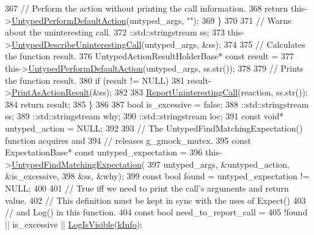 \begin{DoxyCode}
367       \textcolor{comment}{// Perform the action without printing the call information.}
368       \textcolor{keywordflow}{return} this->\hyperlink{classtesting_1_1internal_1_1UntypedFunctionMockerBase_a2cb149456cd559d5b0615f2310b235e3}{UntypedPerformDefaultAction}(untyped\_args, \textcolor{stringliteral}{""});
369     \}
370 
371     \textcolor{comment}{// Warns about the uninteresting call.}
372     ::std::stringstream ss;
373     this->\hyperlink{classtesting_1_1internal_1_1UntypedFunctionMockerBase_aeb80e61406142e87f94fab10873e20ce}{UntypedDescribeUninterestingCall}(untyped\_args, &ss);
374 
375     \textcolor{comment}{// Calculates the function result.}
376     UntypedActionResultHolderBase* \textcolor{keyword}{const} result =
377         this->\hyperlink{classtesting_1_1internal_1_1UntypedFunctionMockerBase_a2cb149456cd559d5b0615f2310b235e3}{UntypedPerformDefaultAction}(untyped\_args, ss.str());
378 
379     \textcolor{comment}{// Prints the function result.}
380     \textcolor{keywordflow}{if} (result != NULL)
381       result->\hyperlink{classtesting_1_1internal_1_1UntypedActionResultHolderBase_a4b4a558fcb1d3b02c0fec34f186d3b90}{PrintAsActionResult}(&ss);
382 
383     \hyperlink{namespacetesting_1_1internal_a8d99a1e87d0cea563b2bfad8a4e65276}{ReportUninterestingCall}(reaction, ss.str());
384     \textcolor{keywordflow}{return} result;
385   \}
386 
387   \textcolor{keywordtype}{bool} is\_excessive = \textcolor{keyword}{false};
388   ::std::stringstream ss;
389   ::std::stringstream why;
390   ::std::stringstream loc;
391   \textcolor{keyword}{const} \textcolor{keywordtype}{void}* untyped\_action = NULL;
392 
393   \textcolor{comment}{// The UntypedFindMatchingExpectation() function acquires and}
394   \textcolor{comment}{// releases g\_gmock\_mutex.}
395   \textcolor{keyword}{const} ExpectationBase* \textcolor{keyword}{const} untyped\_expectation =
396       this->\hyperlink{classtesting_1_1internal_1_1UntypedFunctionMockerBase_a6461abd05786eee4e125a2695382852d}{UntypedFindMatchingExpectation}(
397           untyped\_args, &untyped\_action, &is\_excessive,
398           &ss, &why);
399   \textcolor{keyword}{const} \textcolor{keywordtype}{bool} found = untyped\_expectation != NULL;
400 
401   \textcolor{comment}{// True iff we need to print the call's arguments and return value.}
402   \textcolor{comment}{// This definition must be kept in sync with the uses of Expect()}
403   \textcolor{comment}{// and Log() in this function.}
404   \textcolor{keyword}{const} \textcolor{keywordtype}{bool} need\_to\_report\_call =
405       !found || is\_excessive || \hyperlink{namespacetesting_1_1internal_a69ffdba5ee36743e88d8f89b79e566ff}{LogIsVisible}(\hyperlink{namespacetesting_1_1internal_a203d1a8a2147a53d12bbdae40d443914a396aacfaee2849eaab7c1de9773d624d}{kInfo});

\end{DoxyCode}

